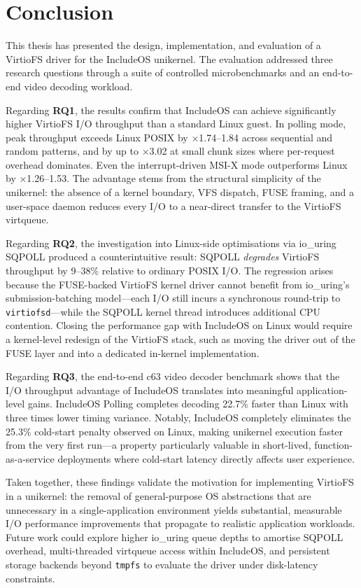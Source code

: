 \section{Conclusion}
\label{sec:conclusion}

This thesis has presented the design, implementation, and evaluation of a
VirtioFS driver for the IncludeOS unikernel.  The evaluation addressed
three research questions through a suite of controlled microbenchmarks
and an end-to-end video decoding workload.

Regarding \textbf{RQ1}, the results confirm that IncludeOS can achieve
significantly higher VirtioFS I/O throughput than a standard Linux guest.
In polling mode, peak throughput exceeds Linux POSIX by $\times$1.74--1.84
across sequential and random patterns, and by up to $\times$3.02 at
small chunk sizes where per-request overhead dominates.  Even the
interrupt-driven MSI-X mode outperforms Linux by $\times$1.26--1.53.
The advantage stems from the structural simplicity of the unikernel: the
absence of a kernel boundary, VFS dispatch, FUSE framing, and a
user-space daemon reduces every I/O to a near-direct transfer to the
VirtioFS virtqueue.

Regarding \textbf{RQ2}, the investigation into Linux-side optimisations
via io\_uring SQPOLL produced a counterintuitive result: SQPOLL
\emph{degrades} VirtioFS throughput by 9--38\% relative to ordinary POSIX
I/O.  The regression arises because the FUSE-backed VirtioFS kernel driver
cannot benefit from io\_uring's submission-batching model—each I/O still
incurs a synchronous round-trip to \texttt{virtiofsd}—while the SQPOLL
kernel thread introduces additional CPU contention.  Closing the
performance gap with IncludeOS on Linux would require a kernel-level
redesign of the VirtioFS stack, such as moving the driver out of the FUSE
layer and into a dedicated in-kernel implementation.

Regarding \textbf{RQ3}, the end-to-end c63 video decoder benchmark shows
that the I/O throughput advantage of IncludeOS translates into meaningful
application-level gains.  IncludeOS Polling completes decoding 22.7\%
faster than Linux with three times lower timing variance.  Notably,
IncludeOS completely eliminates the 25.3\% cold-start penalty observed on
Linux, making unikernel execution faster from the very first run—a
property particularly valuable in short-lived, function-as-a-service
deployments where cold-start latency directly affects user experience.

Taken together, these findings validate the motivation for implementing
VirtioFS in a unikernel: the removal of general-purpose OS abstractions
that are unnecessary in a single-application environment yields
substantial, measurable I/O performance improvements that propagate to
realistic application workloads.  Future work could explore higher
io\_uring queue depths to amortise SQPOLL overhead, multi-threaded
virtqueue access within IncludeOS, and persistent storage backends beyond
\texttt{tmpfs} to evaluate the driver under disk-latency constraints.
